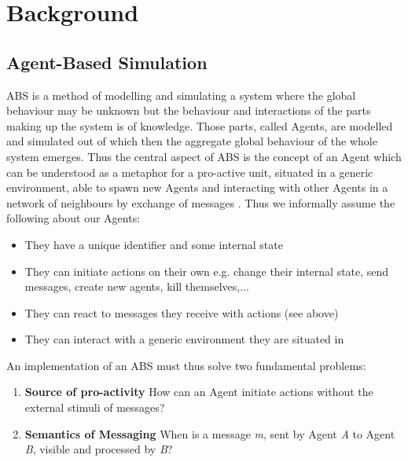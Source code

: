 \section{Background}

\subsection{Agent-Based Simulation}
ABS is a method of modelling and simulating a system where the global behaviour may be unknown but the behaviour and interactions of the parts making up the system is of knowledge. Those parts, called Agents, are modelled and simulated out of which then the aggregate global behaviour of the whole system emerges. Thus the central aspect of ABS is the concept of an Agent which can be understood as a metaphor for a pro-active unit, situated in a generic environment, able to spawn new Agents and interacting with other Agents in a network of neighbours by exchange of messages \cite{wooldridge_introduction_2009}. Thus we informally assume the following about our Agents:

\begin{itemize}
	\item They have a unique identifier and some internal state
	\item They can initiate actions on their own e.g. change their internal state, send messages, create new agents, kill themselves,...
	\item They can react to messages they receive with actions (see above)
	\item They can interact with a generic environment they are situated in
\end{itemize} 

An implementation of an ABS must thus solve two fundamental problems:

\begin{enumerate}
	\item \textbf{Source of pro-activity} How can an Agent initiate actions without the external stimuli of messages?
	\item \textbf{Semantics of Messaging} When is a message \textit{m}, sent by Agent \textit{A} to Agent \textit{B}, visible and processed by \textit{B}?
\end{enumerate}

